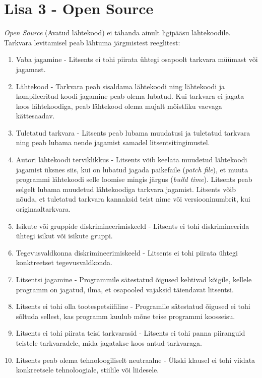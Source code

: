 \documentclass[a4paper,12pt]{article} %
\begin{document}
\section*{Lisa 3 - Open Source}
\label{lisa_open_source}
\textit{Open Source} (Avatud lähtekood) ei tähanda ainult ligipääsu lähtekoodile. Tarkvara levitamisel peab lähtuma järgmistest reeglitest:
\begin{enumerate}
\item Vaba jagamine - Litsents ei tohi piirata ühtegi osapoolt tarkvara müümast või jagamast.
\item Lähtekood -  Tarkvara peab sisaldama lähtekoodi ning lähtekoodi ja kompileeritud koodi jagamine peab olema lubatud. Kui tarkvara ei jagata koos lähtekoodiga, peab lähtekood olema mujalt mõistliku vaevaga kättesaadav.
\item Tuletatud tarkvara - Litsents peab lubama muudatusi ja tuletatud tarkvara ning peab lubama nende jagamist samadel litsentsitingimustel.
\item Autori lähtekoodi terviklikkus - Litsents võib keelata muudetud lähtekoodi jagamist üksnes siis, kui on lubatud jagada paikefaile (\textit{patch file}), et muuta programmi lähtekoodi selle loomise mingis järgus (\textit{build time}). Litsents peab selgelt lubama muudetud lähtekoodiga tarkvara jagamist. Litsents võib nõuda, et tuletatud tarkvara kannaksid teist nime või versiooninumbrit, kui originaaltarkvara.
\item Isikute või gruppide diskrimineerimiskeeld - Litsents ei tohi diskrimineerida ühtegi isikut või isikute gruppi.
\item Tegevusvaldkonna diskrimineerimiskeeld - Litsents ei tohi piirata ühtegi konktreetset tegevusvaldkonda.
\item Litsentsi jagamine - Programmile sätestatud õigused kehtivad kõigile, kellele programm on jagatud, ilma, et osapooled vajaksid täiendavat litsentsi.
\item Litsents ei tohi olla tootespetsiifiline - Programile sätestatud õigused ei tohi sõltuda sellest, kas programm kuulub mõne teise programmi koosseisu.
\item Litsents ei tohi piirata teisi tarkvarasid - Litsents ei tohi panna piiranguid teistele tarkvaradele, mida jagatakse koos antud tarkvaraga.
\item Litsents peab olema tehnoloogiliselt neutraalne - Ükski klausel ei tohi viidata konkreetsele tehnoloogiale, stiilile või liidesele.
\end{enumerate}
\cite{Open_Source_Def}
\end{document}

